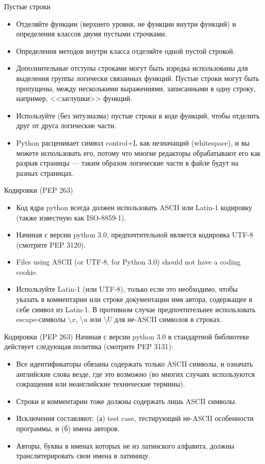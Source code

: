 \documentclass[xcolor=table]{beamer}
\begin{document}
\begin{frame}{Пустые строки}
	\begin{itemize}
		\item Отделяйте функции (верхнего уровня, не функции внутри функций) и определения классов двумя пустыми строчками.
		\item Определения методов внутри класса отделяйте одной пустой строкой.
		\item Дополнительные отступы строками могут быть изредка использованы для выделения группы логически связанных функций. Пустые строки могут быть пропущены, между несколькими выражениями, записанными в одну строку, например, <<заглушки>> функций.
		\item Используйте (без энтузиазма) пустые строки в коде функций, чтобы отделить друг от друга логические части.
		\item Python расценивает символ control+L как незначащий (whitespace), и вы можете использовать его, потому что многие редакторы обрабатывают его как разрыв страницы — таким образом логические части в файле будут на разных страницах.		
	\end{itemize}
\end{frame}

\begin{frame}{Кодировки (PEP 263)}
	\begin{itemize}
		\item Код ядра python всегда должен использовать ASCII или Latin-1 кодировку (также известную как ISO-8859-1). 
		\item Начиная с версии python 3.0, предпочтительной является кодировка UTF-8 (смотрите PEP 3120).
		\item Files using ASCII (or UTF-8, for Python 3.0) should not have a coding cookie. 
		\item Используйте Latin-1 (или UTF-8), только если это необходимо, чтобы указать в комментарии или строке документации имя автора, содержащее в себе символ из Latin-1. В противном случае предпочтительнее использовать escape-символы $\setminus x$, $\setminus u$ или $\setminus U$ для не-ASCII символов в строках.
	\end{itemize}
\end{frame}

\begin{frame}{Кодировки (PEP 263)}
	Начиная с версии python 3.0 в стандартной библиотеке действует следующая политика (смотрите PEP 3131): 
	\begin{itemize}
		\item Все идентификаторы обязаны содержать только ASCII символы, и означать английские слова везде, где это возможно (во многих случаях используются сокращения или неанглийские технические термины). 
		\item Строки и комментарии тоже должны содержать лишь ASCII символы.
		\item Исключения составляют: (а) test case, тестирующий не-ASCII особенности программы, и (б) имена авторов. 
		\item Авторы, буквы в именах которых не из латинского алфавита, должны транслитерировать свои имена в латиницу.		
	\end{itemize}
\end{frame}
\end{document}
